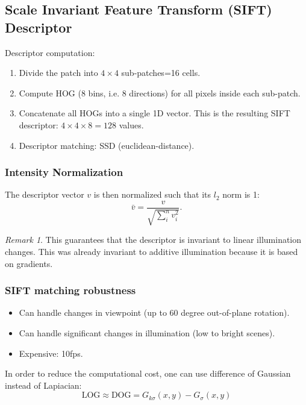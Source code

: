 \documentclass[a4paper,12 pt]{article}
\theoremstyle{definition}
\theoremstyle{remark}
\newtheorem*{bmk}{Remark}
\theoremstyle{definition}
\theoremstyle{definition}
\theoremstyle{definition}
\theoremstyle{remark}
\theoremstyle{definition}
\begin{document}
\subsection*{Scale Invariant Feature Transform (SIFT) Descriptor}
Descriptor computation:
\begin{enumerate}
\item Divide the patch into $4\times4$ sub-patches=16 cells.
\item Compute HOG (8 bins, i.e. 8 directions) for all pixels inside each sub-patch.
\item Concatenate all HOGs into a single 1D vector. This is the resulting SIFT descriptor: $4\times 4 \times 8=128$ values.
\item Descriptor matching: SSD (euclidean-distance).
\end{enumerate}
\subsubsection*{Intensity Normalization}
The descriptor vector $v$ is then normalized such that its $l_2$ norm is 1:
\begin{equation}
\bar{v}=\frac{v}{\sqrt{\sum_{i}^nv_i^2}}.
\end{equation}
\begin{bmk}
This guarantees that the descriptor is invariant to linear illumination changes. This was already invariant to additive illumination because it is based on gradients.
\end{bmk}
\subsubsection*{SIFT matching robustness}
\begin{itemize}
\item Can handle changes in viewpoint (up to 60 degree out-of-plane rotation).
\item Can handle significant changes in illumination (low to bright scenes).
\item Expensive: 10fps.
\end{itemize}
In order to reduce the computational cost, one can use difference of Gaussian instead of Lapiacian:
\begin{equation}
\text{LOG}\approx \text{DOG}=G_{k\sigma}(x,y)-G_{\sigma}(x,y)
\end{equation}
\end{document}
